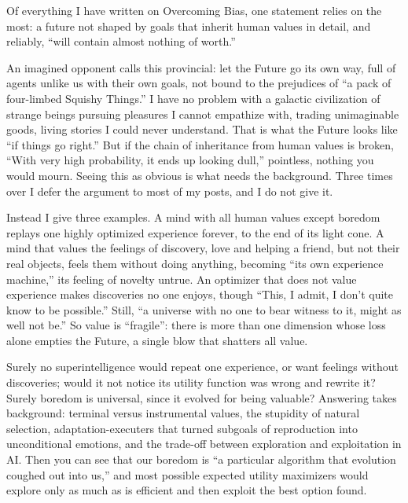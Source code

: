 
Of everything I have written on Overcoming Bias, one statement relies on the most: a future not shaped by goals that inherit human values in detail, and reliably, ``will contain almost nothing of worth.''

An imagined opponent calls this provincial: let the Future go its own way, full of agents unlike us with their own goals, not bound to the prejudices of ``a pack of four-limbed Squishy Things.'' I have no problem with a galactic civilization of strange beings pursuing pleasures I cannot empathize with, trading unimaginable goods, living stories I could never understand. That is what the Future looks like ``if things go right.'' But if the chain of inheritance from human values is broken, ``With very high probability, it ends up looking dull,'' pointless, nothing you would mourn. Seeing this as obvious is what needs the background. Three times over I defer the argument to most of my posts, and I do not give it.

Instead I give three examples. A mind with all human values except boredom replays one highly optimized experience forever, to the end of its light cone. A mind that values the feelings of discovery, love and helping a friend, but not their real objects, feels them without doing anything, becoming ``its own experience machine,'' its feeling of novelty untrue.  An optimizer that does not value experience makes discoveries no one enjoys, though ``This, I admit, I don't quite know to be possible.'' Still, ``a universe with no one to bear witness to it, might as well not be.''  So value is ``fragile'': there is more than one dimension whose loss alone empties the Future, a single blow that shatters all value.

Surely no superintelligence would repeat one experience, or want feelings without discoveries; would it not notice its utility function was wrong and rewrite it? Surely boredom is universal, since it evolved for being valuable? Answering takes background: terminal versus instrumental values, the stupidity of natural selection, adaptation-executers that turned subgoals of reproduction into unconditional emotions, and the trade-off between exploration and exploitation in AI. Then you can see that our boredom is ``a particular algorithm that evolution coughed out into us,'' and most possible expected utility maximizers would explore only as much as is efficient and then exploit the best option found. 

